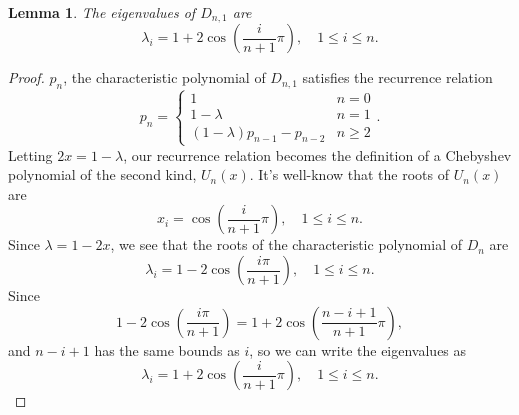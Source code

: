 \documentclass[12pt]{article}
\newtheorem{lemma}{Lemma}
\begin{document}
	\begin{lemma}\label{lem:k1eigvals}
		The eigenvalues of $D_{n,1}$ are
		\begin{equation*}
		\lambda_i = 1 + 2\cos{\left(\frac{i}{n+1}\pi\right)}, \hspace{12pt} 1 \leq i
		\leq n.
		\end{equation*}
	\end{lemma}
	
	\begin{proof}
		$p_n$, the characteristic polynomial of $D_{n,1}$ satisfies the recurrence
		relation
		\begin{equation*}
		p_n = \begin{cases}
		1 & n = 0 \\
		1-\lambda & n = 1 \\
		(1-\lambda)p_{n-1} - p_{n-2} & n \geq 2
		\end{cases}.
		\end{equation*}
		Letting $2x = 1-\lambda$, our recurrence relation becomes the definition of a
		Chebyshev polynomial of the second kind, $U_n(x)$. It's well-know that the roots
		of $U_n(x)$ are
		\begin{equation*}
		x_i = \cos{\left(\frac{i}{n+1}\pi\right)}, \hspace{12pt} 1 \leq i \leq n.
		\end{equation*}
		Since $\lambda = 1-2x$, we see that the roots of the characteristic polynomial
		of $D_n$ are
		\begin{equation*}
		\lambda_i = 1-2\cos{\left(\frac{i\pi}{n+1}\right)}, \hspace{12pt} 1 \leq i
		\leq n.
		\end{equation*}
		Since
		\begin{equation*}
		1 - 2\cos{\left(\frac{i\pi}{n+1}\right)} = 1 +
		2\cos{\left(\frac{n-i+1}{n+1}\pi\right)},
		\end{equation*}
		and $n-i+1$ has the same bounds as $i$, so we can write the eigenvalues as
		\begin{equation*}
		\lambda_i = 1 + 2\cos{\left(\frac{i}{n+1}\pi\right)}, \hspace{12pt} 1 \leq i
		\leq n.
		\end{equation*}
	\end{proof}
	
\end{document}
